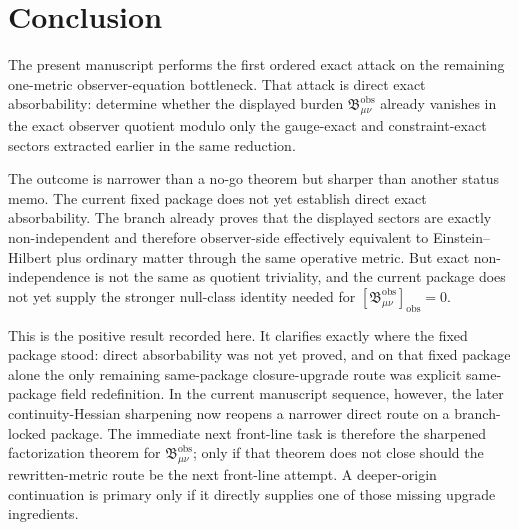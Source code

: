 \documentclass[11pt]{article}
\newcommand{\ObsBurden}{\mathfrak B_{\mu\nu}^{\mathrm{obs}}}
\newcommand{\ObserverClass}[1]{\left[#1\right]_{\mathrm{obs}}}
\begin{document}
\section{Conclusion}

The present manuscript performs the first ordered exact attack on the remaining one-metric observer-equation bottleneck. That attack is direct exact absorbability: determine whether the displayed burden \(\ObsBurden\) already vanishes in the exact observer quotient modulo only the gauge-exact and constraint-exact sectors extracted earlier in the same reduction.

The outcome is narrower than a no-go theorem but sharper than another status memo. The current fixed package does not yet establish direct exact absorbability. The branch already proves that the displayed sectors are exactly non-independent and therefore observer-side effectively equivalent to Einstein--Hilbert plus ordinary matter through the same operative metric. But exact non-independence is not the same as quotient triviality, and the current package does not yet supply the stronger null-class identity needed for \(\ObserverClass{\ObsBurden}=0\).

This is the positive result recorded here. It clarifies exactly where the fixed package stood: direct absorbability was not yet proved, and on that fixed package alone the only remaining same-package closure-upgrade route was explicit same-package field redefinition. In the current manuscript sequence, however, the later continuity-Hessian sharpening now reopens a narrower direct route on a branch-locked package. The immediate next front-line task is therefore the sharpened factorization theorem for \(\ObsBurden\); only if that theorem does not close should the rewritten-metric route be the next front-line attempt. A deeper-origin continuation is primary only if it directly supplies one of those missing upgrade ingredients.
\end{document}
